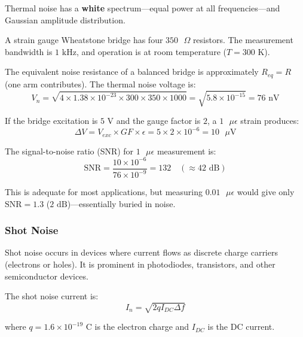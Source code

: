 Thermal noise has a \textbf{white} spectrum---equal power at all frequencies---and Gaussian amplitude distribution.

\begin{example}
\label{ex:thermal_noise}

A strain gauge Wheatstone bridge has four $350\text{ }\Omega$ resistors. The measurement bandwidth is $1\text{ kHz}$, and operation is at room temperature ($T = 300\text{ K}$).

The equivalent noise resistance of a balanced bridge is approximately $R_{eq} = R$ (one arm contributes). The thermal noise voltage is:
\begin{equation}
V_n = \sqrt{4 \times 1.38 \times 10^{-23} \times 300 \times 350 \times 1000} = \sqrt{5.8 \times 10^{-15}} = 76\text{ nV}
\end{equation}

If the bridge excitation is $5\text{ V}$ and the gauge factor is $2$, a $1\text{ }\mu\epsilon$ strain produces:
\begin{equation}
\Delta V = V_{exc} \times GF \times \epsilon = 5 \times 2 \times 10^{-6} = 10\text{ }\mu\text{V}
\end{equation}

The signal-to-noise ratio (SNR) for $1\text{ }\mu\epsilon$ measurement is:
\begin{equation}
\text{SNR} = \frac{10 \times 10^{-6}}{76 \times 10^{-9}} = 132 \quad (\approx 42\text{ dB})
\end{equation}

This is adequate for most applications, but measuring $0.01\text{ }\mu\epsilon$ would give only $\text{SNR} = 1.3$ ($2\text{ dB}$)---essentially buried in noise.
\end{example}

\subsubsection{Shot Noise}

Shot noise occurs in devices where current flows as discrete charge carriers (electrons or holes). It is prominent in photodiodes, transistors, and other semiconductor devices.

The shot noise current is:
\begin{equation}
I_n = \sqrt{2qI_{DC}\Delta f}
\label{eq:shot_noise}
\end{equation}

where $q = 1.6 \times 10^{-19}\text{ C}$ is the electron charge and $I_{DC}$ is the DC current.

